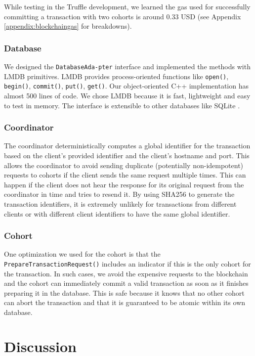 \documentclass[11pt,sigplan,screen,nonacm]{acmart}
\begin{document}
While testing in the Truffle development, we learned the gas used for successfully committing a transaction with two cohorts is around 0.33 USD \cite{gwei} (see Appendix \ref{appendix:blockchaingas} for breakdowns).

\subsubsection{Database}
We designed the \texttt{DatabaseAda-pter} interface and implemented the methods with LMDB primitives. LMDB provides process-oriented functions like \texttt{open()}, \texttt{begin()}, \texttt{commit()}, \texttt{put()}, \texttt{get()}. Our object-oriented C++ implementation has almost 500 lines of code. We chose LMDB because it is fast, lightweight and easy to test in memory. The interface is extensible to other databases like SQLite \cite{bhosale2015sqlite}.

\subsubsection{Coordinator}
The coordinator deterministically computes a global identifier for the transaction based on the client’s provided identifier and the client’s hostname and port. This allows the coordinator to avoid sending duplicate (potentially non-idempotent) requests to cohorts if the client sends the same request multiple times. This can happen if the client does not hear the response for its original request from the coordinator in time and tries to resend it. By using SHA256 to generate the transaction identifiers, it is extremely unlikely for transactions from different clients or with different client identifiers to have the same global identifier.

\subsubsection{Cohort}
One optimization we used for the cohort is that the \texttt{PrepareTransactionRequest()} includes an indicator if this is the only cohort for the transaction. In such cases, we avoid the expensive requests to the blockchain and the cohort can immediately commit a valid transaction as soon as it finishes preparing it in the database. This is safe because it knows that no other cohort can abort the transaction and that it is guaranteed to be atomic within its own database.

\section{Discussion}
\end{document}
